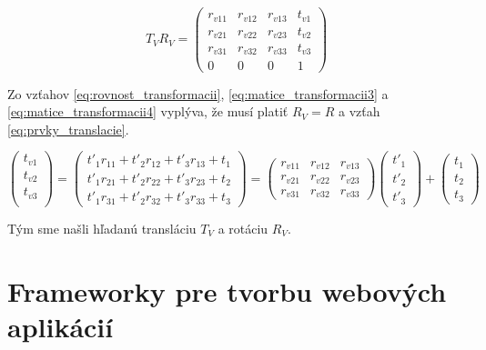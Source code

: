 \begin{equation}
    T_V R_V =
    \begin{pmatrix}
    r_{v11} & r_{v12} & r_{v13} & t_{v1} \\
    r_{v21} & r_{v22} & r_{v23} & t_{v2} \\
    r_{v31} & r_{v32} & r_{v33} & t_{v3} \\
    0 & 0 & 0 & 1
    \end{pmatrix}
\label{eq:matice_transformacii4}
\end{equation}

Zo vzťahov \ref{eq:rovnost_transformacii}, \ref{eq:matice_transformacii3} a \ref{eq:matice_transformacii4} vyplýva, že musí platiť $R_V = R$ a vzťah \ref{eq:prvky_translacie}.

\begin{equation}
    \begin{pmatrix}
    t_{v1} \\
    t_{v2} \\
    t_{v3} \\
    \end{pmatrix}
    =
    \begin{pmatrix}
    t'_1 r_{11} + t'_2 r_{12} + t'_3 r_{13} + t_1 \\
    t'_1 r_{21} + t'_2 r_{22} + t'_3 r_{23} + t_2 \\
    t'_1 r_{31} + t'_2 r_{32} + t'_3 r_{33} + t_3
    \end{pmatrix}
    =
    \begin{pmatrix}
    r_{v11} & r_{v12} & r_{v13} \\
    r_{v21} & r_{v22} & r_{v23} \\
    r_{v31} & r_{v32} & r_{v33}
    \end{pmatrix}
    \begin{pmatrix}
    t'_1 \\
    t'_2 \\
    t'_3
    \end{pmatrix}
    +
    \begin{pmatrix}
    t_1 \\
    t_2 \\
    t_3
    \end{pmatrix}
\label{eq:prvky_translacie}
\end{equation}

Tým sme našli hľadanú transláciu $T_V$ a rotáciu $R_V$.

\section{Frameworky pre tvorbu webových aplikácií}

